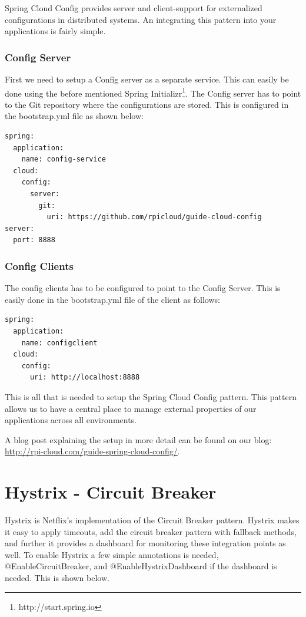 \noindent Spring Cloud Config provides server and client-support for externalized configurations in distributed systems. An integrating this pattern into your applications is fairly simple.

\subsubsection*{Config Server}
First we need to setup a Config server as a separate service. This can easily be done using the before mentioned Spring Initializr\footnote{http://start.spring.io}. The Config server has to point to the Git repository where the configurations are stored. This is configured in the bootstrap.yml file as shown below:

\begin{lstlisting}
spring:  
  application:
    name: config-service
  cloud:
    config:
      server:
        git:
          uri: https://github.com/rpicloud/guide-cloud-config
server:  
  port: 8888
\end{lstlisting}

\subsubsection*{Config Clients}
The config clients has to be configured to point to the Config Server. This is easily done in the bootstrap.yml file of the client as follows:


\begin{lstlisting}[]
spring:  
  application:
    name: configclient
  cloud:
    config:
      uri: http://localhost:8888
\end{lstlisting}

\noindent This is all that is needed to setup the Spring Cloud Config pattern. This pattern allows us to have a central place to manage external properties of our applications across all environments. 

\noindent A blog post explaining the setup in more detail can be found on our blog: \url{http://rpi-cloud.com/guide-spring-cloud-config/}.


\section*{Hystrix - Circuit Breaker}

Hystrix is Netflix's implementation of the Circuit Breaker pattern. Hystrix makes it easy to apply timeouts, add the circuit breaker pattern with fallback methods, and further it provides a dashboard for monitoring these integration points as well. To enable Hystrix a few simple annotations is needed, @EnableCircuitBreaker, and @EnableHystrixDashboard if the dashboard is needed. This is shown below.

